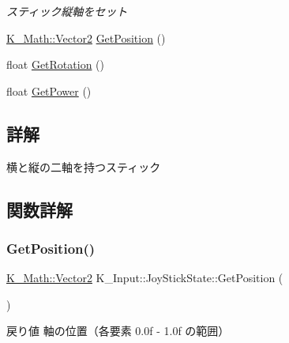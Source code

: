 \begin{DoxyCompactItemize}
\begin{DoxyCompactList}\small\item\em スティック縦軸をセット \end{DoxyCompactList}\item 
\mbox{\hyperlink{namespace_k___math_a41eb0c2c69c938cd59989eb3241cefb2}{K\+\_\+\+Math\+::\+Vector2}} \mbox{\hyperlink{struct_k___input_1_1_joy_stick_state_a44183af6048028d62d2ad2e1ba48e060}{Get\+Position}} ()
\item 
float \mbox{\hyperlink{struct_k___input_1_1_joy_stick_state_a86a14421540711ba760f607adc2e73ca}{Get\+Rotation}} ()
\item 
float \mbox{\hyperlink{struct_k___input_1_1_joy_stick_state_a776fba0de2ecbfdec3636e857131d72e}{Get\+Power}} ()
\end{DoxyCompactItemize}


\subsection{詳解}
横と縦の二軸を持つスティック 

\subsection{関数詳解}
\mbox{\label{struct_k___input_1_1_joy_stick_state_a44183af6048028d62d2ad2e1ba48e060}} 
\subsubsection{\texorpdfstring{Get\+Position()}{GetPosition()}\hspace{0.1cm}{\footnotesize\ttfamily [1/2]}}
{\footnotesize\ttfamily \mbox{\hyperlink{namespace_k___math_a41eb0c2c69c938cd59989eb3241cefb2}{K\+\_\+\+Math\+::\+Vector2}} K\+\_\+\+Input\+::\+Joy\+Stick\+State\+::\+Get\+Position (\begin{DoxyParamCaption}{ }\end{DoxyParamCaption})\hspace{0.3cm}{\ttfamily [inline]}}

\begin{DoxyReturn}{戻り値}
軸の位置（各要素 0.\+0f -\/ 1.\+0f の範囲） 
\end{DoxyReturn}
\mbox{\label{struct_k___input_1_1_joy_stick_state_a44183af6048028d62d2ad2e1ba48e060}} 
